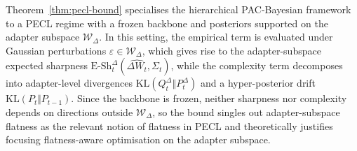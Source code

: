\documentclass{article}
\theoremstyle{plain}
\newtheorem{theorem}{Theorem}[section]
\theoremstyle{definition}
\theoremstyle{remark}
\begin{document}
Theorem~\ref{thm:pecl-bound} specialises the hierarchical PAC-Bayesian framework to a PECL regime with a frozen backbone and posteriors supported on the adapter subspace $\mathcal{W}_\Delta$. In this setting, the empirical term is evaluated under Gaussian perturbations \( \varepsilon \in \mathcal W_\Delta \), which gives rise to the adapter-subspace expected sharpness \( \mathrm{E\text{-}Sh}^{\Delta}_t(\hat{\Delta W_t},\Sigma_t) \), while the complexity term decomposes into adapter-level divergences \( \mathrm{KL}(Q^\Delta_t \Vert P^\Delta_t) \) and a hyper-posterior drift \( \mathrm{KL}(P_t \Vert P_{t-1}) \). Since the backbone is frozen, neither sharpness nor complexity depends on directions outside \( \mathcal W_\Delta \), so the bound singles out adapter-subspace flatness as the relevant notion of flatness in PECL and theoretically justifies focusing flatness-aware optimisation on the adapter subspace.








\end{document}
